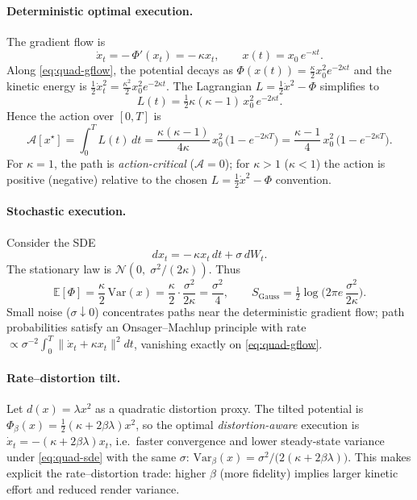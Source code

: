 \documentclass[12pt,a4paper]{article}
\theoremstyle{plain}
\theoremstyle{definition}
\theoremstyle{remark}
\newcommand{\Phifield}{\Phi}
\begin{document}
\paragraph{Deterministic optimal execution.}
The gradient flow is
\begin{equation}\label{eq:quad-gflow}
\dot x_t = -\,\Phifield'(x_t)= -\,\kappa x_t, \qquad x(t)=x_0\,e^{-\kappa t}.
\end{equation}
Along \eqref{eq:quad-gflow}, the potential decays as $\Phifield(x(t))=\tfrac{\kappa}{2}x_0^{2} e^{-2\kappa t}$ and the kinetic energy is $\tfrac{1}{2}\dot x_t^{2}=\tfrac{\kappa^{2}}{2}x_0^{2} e^{-2\kappa t}$. The Lagrangian $L=\tfrac{1}{2}\dot x^{2}-\Phifield$ simplifies to
\[
L(t)=\tfrac{1}{2}\kappa(\kappa-1)\,x_0^{2}\,e^{-2\kappa t}.
\]
Hence the action over $[0,T]$ is
\begin{equation}\label{eq:quad-action}
\mathcal{A}[x^{\star}] =\int_{0}^{T} L(t)\,dt =\frac{\kappa(\kappa-1)}{4\kappa}\,x_0^{2}\,\big(1-e^{-2\kappa T}\big) =\frac{\kappa-1}{4}\,x_0^{2}\,\big(1-e^{-2\kappa T}\big).
\end{equation}
For $\kappa=1$, the path is \emph{action-critical} ($\mathcal{A}=0$); for $\kappa>1$ ($\kappa<1$) the action is positive (negative) relative to the chosen $L=\tfrac{1}{2}\dot x^{2}-\Phifield$ convention.

\paragraph{Stochastic execution.}
Consider the SDE
\begin{equation}\label{eq:quad-sde}
dx_t = -\,\kappa x_t\,dt + \sigma\,dW_t .
\end{equation}
The stationary law is $\mathcal{N}(0,\;\sigma^{2}/(2\kappa))$. Thus
\[
\mathbb{E}[\Phifield] = \frac{\kappa}{2}\,\mathrm{Var}(x) = \frac{\kappa}{2}\cdot\frac{\sigma^{2}}{2\kappa} = \frac{\sigma^{2}}{4}, \qquad S_{\mathrm{Gauss}}=\tfrac{1}{2}\log\!\Big(2\pi e\,\frac{\sigma^{2}}{2\kappa}\Big).
\]
Small noise ($\sigma\!\downarrow\!0$) concentrates paths near the deterministic gradient flow; path probabilities satisfy an Onsager--Machlup principle with rate $\propto \sigma^{-2}\!\int_{0}^{T}\!\|\dot x_t + \kappa x_t\|^{2}dt$, vanishing exactly on \eqref{eq:quad-gflow}.

\paragraph{Rate--distortion tilt.}
Let $d(x)=\lambda x^{2}$ as a quadratic distortion proxy. The tilted potential is $\Phifield_{\beta}(x)=\tfrac{1}{2}(\kappa+2\beta\lambda)x^{2}$, so the optimal \emph{distortion-aware} execution is $\dot x_t = -(\kappa+2\beta\lambda)x_t$, i.e.\ faster convergence and lower steady-state variance under \eqref{eq:quad-sde} with the same $\sigma$: $\mathrm{Var}_{\beta}(x)=\sigma^{2}/\big(2(\kappa+2\beta\lambda)\big)$. This makes explicit the rate–distortion trade: higher $\beta$ (more fidelity) implies larger kinetic effort and reduced render variance.
\end{document}
